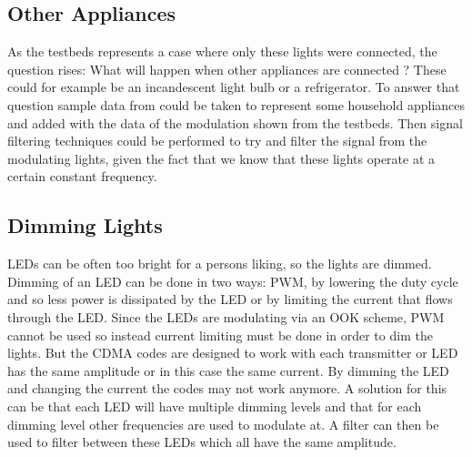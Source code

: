 	\subsection{Other Appliances}

	As the testbeds represents a case where only these lights were connected, the question rises: What will happen when other appliances are connected ?
	These could for example be an incandescent light bulb or a refrigerator.
	To answer that question sample data from \cite{kolter2011redd} could be taken to represent some household appliances and added with the data of the modulation shown from the testbeds.
	Then signal filtering techniques could be performed to try and filter the signal from the modulating lights, given the fact that we know that these lights operate at a certain constant frequency.


	\subsection{Dimming Lights}

	LEDs can be often too bright for a persons liking, so the lights are dimmed.
	Dimming of an LED can be done in two ways: PWM, by lowering the duty cycle and so less power is dissipated by the LED or by limiting the current that flows through the LED.
	Since the LEDs are modulating via an OOK scheme, PWM cannot be used so instead current limiting must be done in order to dim the lights.
	But the CDMA codes are designed to work with each transmitter or LED has the same amplitude or in this case the same current.
	By dimming the LED and changing the current the codes may not work anymore.
	A solution for this can be that each LED will have multiple dimming levels and that for each dimming level other frequencies are used to modulate at.
	A filter can then be used to filter between these LEDs which all have the same amplitude.









